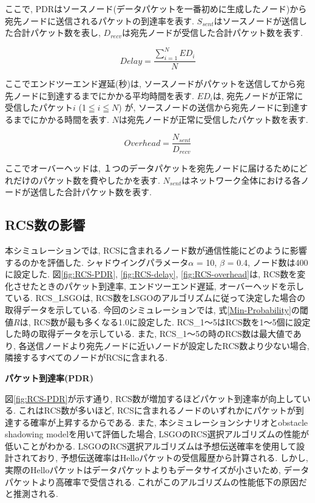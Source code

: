 \documentclass[10pt]{jreport}
\begin{document}
ここで, PDRはソースノード(データパケットを一番初めに生成したノード)から宛先ノードに送信されるパケットの到達率を表す. $S_{sent}$はソースノードが送信した合計パケット数を表し, $D_{recv}$は宛先ノードが受信した合計パケット数を表す.

\begin{equation}
	\label{delay}
	Delay = \frac{\sum_{i=1}^{N}ED_i}{N}
\end{equation}

ここでエンドツーエンド遅延(秒)は, ソースノードがパケットを送信してから宛先ノードに到達するまでにかかる平均時間を表す. $ED_i$は, 宛先ノードが正常に受信したパケット$i$ (1$ \leqq $$i$$ \leqq $$N$) が, ソースノードの送信から宛先ノードに到達するまでにかかる時間を表す. 
$N$は宛先ノードが正常に受信したパケット数を表す.

\begin{equation}
	\label{overhead}
	Overhead = \frac{N_{sent}}{  D_{recv}  }
\end{equation}

ここでオーバーヘッドは, １つのデータパケットを宛先ノードに届けるためにどれだけのパケット数を費やしたかを表す. $N_{sent}$はネットワーク全体における各ノードが送信した合計パケット数を表す.

\subsection{RCS数の影響}
本シミュレーションでは, RCSに含まれるノード数が通信性能にどのように影響するのかを評価した.
シャドウイングパラメータ$\alpha$ = 10, $\beta$ = 0.4, ノード数は400に設定した.
図\ref{fig:RCS-PDR}, \ref{fig:RCS-delay}, \ref{fig:RCS-overhead}は, RCS数を変化させたときのパケット到達率, エンドツーエンド遅延, オーバーヘッドを示している. RCS\_LSGOは, RCS数をLSGOのアルゴリズムに従って決定した場合の取得データを示している. 今回のシミュレーションでは, 式\ref{Min-Probability}の閾値$R$は, RCS数が最も多くなる1.0に設定した. RCS\_1～5はRCS数を1～5個に設定した時の取得データを示している. また, RCS\_1～5の時のRCS数は最大値であり, 各送信ノードより宛先ノードに近いノードが設定したRCS数より少ない場合, 隣接するすべてのノードがRCSに含まれる.
\par
\vspace{5mm}
\noindent
\textbf{パケット到達率(PDR)}
\vspace{5mm}


図\ref{fig:RCS-PDR}が示す通り, RCS数が増加するほどパケット到達率が向上している. これはRCS数が多いほど, RCSに含まれるノードのいずれかにパケットが到達する確率が上昇するからである. また, 本シミュレーションシナリオとobstacle shadowing modelを用いて評価した場合, LSGOのRCS選択アルゴリズムの性能が低いことがわかる. LSGOのRCS選択アルゴリズムは予想伝送確率を使用して設計されており, 予想伝送確率はHelloパケットの受信履歴から計算される. しかし, 実際のHelloパケットはデータパケットよりもデータサイズが小さいため, データパケットより高確率で受信される. これがこのアルゴリズムの性能低下の原因だと推測される.
\end{document}
